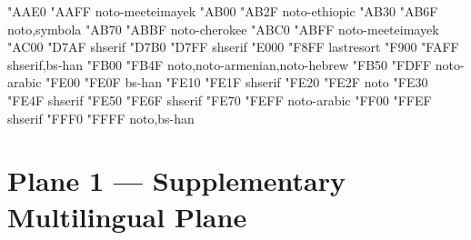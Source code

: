 \documentclass{article}
\begin{document}
                        {  "AAE0} {  "AAFF} {noto-meeteimayek}
                            {  "AB00} {  "AB2F} {noto-ethiopic}
                               {  "AB30} {  "AB6F} {noto,symbola}
                            {  "AB70} {  "ABBF} {noto-cherokee}
                                   {  "ABC0} {  "ABFF} {noto-meeteimayek}
                               {  "AC00} {  "D7AF} {shserif}
                         {  "D7B0} {  "D7FF} {shserif}
                               {  "E000} {  "F8FF} {lastresort}
                   {  "F900} {  "FAFF} {shserif,bs-han}
                  {  "FB00} {  "FB4F} {noto,noto-armenian,noto-hebrew}
                    {  "FB50} {  "FDFF} {noto-arabic}
                            {  "FE00} {  "FE0F} {bs-han}
                                 {  "FE10} {  "FE1F} {shserif}
                           {  "FE20} {  "FE2F} {noto}
                        {  "FE30} {  "FE4F} {shserif}
                            {  "FE50} {  "FE6F} {shserif}
                    {  "FE70} {  "FEFF} {noto-arabic}
                  {  "FF00} {  "FFEF} {shserif}
                                       {  "FFF0} {  "FFFF} {noto,bs-han}

\section{Plane 1 --- Supplementary Multilingual Plane}
\end{document}
